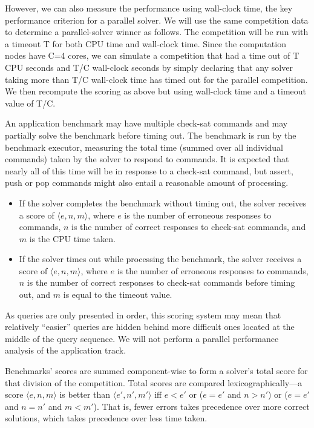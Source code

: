 \documentclass[12pt]{article}
\begin{document}
However, we can also measure the performance using wall-clock time, the key performance criterion for a parallel solver.
We will use the same competition data to determine a parallel-solver winner as follows. The competition will be run with a timeout T for both CPU time and wall-clock time. Since the computation nodes have C=4 cores, we can simulate a competition that had a time out of T CPU seconds and T/C wall-clock seconds by simply declaring that any solver taking more than T/C wall-clock time has timed out for the parallel competition. We then recompute the scoring as above but using wall-clock time and a timeout value of T/C. 

An application benchmark may have multiple check-sat commands and may partially solve the benchmark before timing out.
The benchmark is run by the benchmark executor, measuring the total time (summed over all individual commands) taken by
the solver to respond to commands. It is expected that nearly all of this time will be in response to a check-sat command, but assert, push or pop commands might also entail a reasonable amount of processing.
\begin{itemize}
\item If the solver completes the benchmark without timing out, the solver receives a score of $\langle e,n,m\rangle$,
where $e$ is the number of erroneous responses to commands, $n$ is the number of correct responses to check-sat commands, and $m$ is the CPU time taken.
\item If the solver times out while processing the benchmark, the solver receives a score of $\langle e,n,m\rangle$,
where $e$ is the number of erroneous responses to commands, $n$ is the number of correct responses to check-sat commands before timing out, and $m$ is equal to the timeout value.
\end{itemize}

As queries are only presented in order, this scoring system may mean
that relatively ``easier'' queries are hidden behind more difficult
ones located at the middle of the query sequence. We will not perform a parallel performance analysis of the application track.

Benchmarks' scores are summed component-wise to form a solver's total
score for that division of the competition.
Total scores are compared lexicographically---a score $\langle e,n,m\rangle$ is better than 
$\langle e',n',m'\rangle$ iff $e < e'$ or ($e = e'$ and $n > n'$) or ($e = e'$ and $n = n'$ and $m < m'$).
That is, fewer errors takes precedence over more correct solutions, which takes precedence over less time taken.
\end{document}
